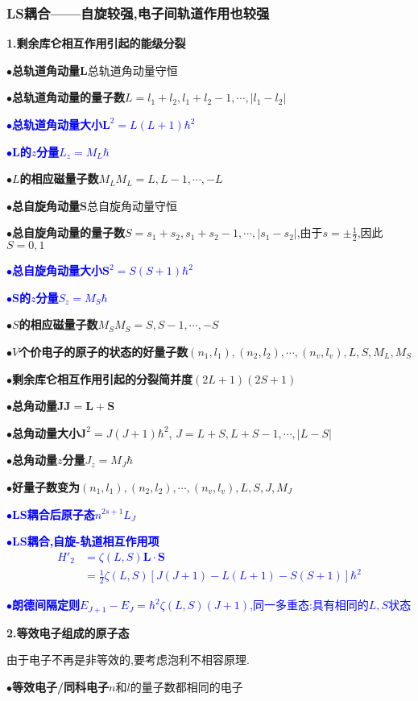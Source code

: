 \documentclass[UTF8]{article}
\newcommand{\keypoint}[2]{$\bullet$\textbf{#1}\quad#2\par}
\newcommand{\jumpline} {\hspace*{\fill} \par}
\begin{document}
\subsubsection{LS耦合——自旋较强,电子间轨道作用也较强}
\textbf{1.剩余库仑相互作用引起的能级分裂}\par
\keypoint{总轨道角动量$\bm{L}$}{总轨道角动量守恒}
\keypoint{总轨道角动量的量子数}{$L=l_1+l_2,l_1+l_2-1,\cdots,|l_1-l_2|$}
\textcolor{blue}{\keypoint{总轨道角动量大小}{$\bm{L}^2=L(L+1)\hbar^2$}}
\textcolor{blue}{\keypoint{$\bm{L}$的$z$分量}{$L_z=M_L\hbar$}}
\keypoint{$L$的相应磁量子数$M_L$}{$M_L=L,L-1,\cdots,-L$}
\keypoint{总自旋角动量$\bm{S}$}{总自旋角动量守恒}
\keypoint{总自旋角动量的量子数}{$S=s_1+s_2,s_1+s_2-1,\cdots,|s_1-s_2|$,由于$s=\pm\frac{1}{2}$,因此$S=0,1$}
\textcolor{blue}{\keypoint{总自旋角动量大小}{$\bm{S}^2=S(S+1)\hbar^2$}}
\textcolor{blue}{\keypoint{$\bm{S}$的$z$分量}{$S_z=M_S\hbar$}}
\keypoint{$S$的相应磁量子数$M_S$}{$M_S=S,S-1,\cdots,-S$}
\keypoint{$V$个价电子的原子的状态的好量子数}{$(n_1,l_1),(n_2,l_2),\cdots,(n_v,l_v),L,S,M_L,M_S$}
\keypoint{剩余库仑相互作用引起的分裂简并度}{$(2L+1)(2S+1)$}
\jumpline
\keypoint{总角动量$\bm{J}$}{$\bm{J}=\bm{L}+\bm{S}$}
\keypoint{总角动量大小}{$\bm{J}^2=J(J+1)\hbar^2$, $J=L+S,L+S-1,\cdots,|L-S|$}
\keypoint{总角动量$z$分量}{$J_z=M_J\hbar$}
\keypoint{好量子数变为}{$(n_1,l_1),(n_2,l_2),\cdots,(n_v,l_v),L,S,J,M_J$}
\textcolor{blue}{\keypoint{LS耦合后原子态}{$n^{2s+1}L_J$}}
\textcolor{blue}{\keypoint{LS耦合,自旋-轨道相互作用项}{
	\begin{align*}
	H'_2&=\zeta(L,S)\bm{L\cdot S}\\
		&=\frac{1}{2}\zeta(L,S)[J(J+1)-L(L+1)-S(S+1)]\hbar^2
	\end{align*}
}}
\textcolor{blue}{\keypoint{朗德间隔定则}{$E_{J+1}-E_J=\hbar^2\zeta(L,S)(J+1)$,同一多重态:具有相同的$L,S$状态}}
\textbf{2.等效电子组成的原子态}\par
由于电子不再是非等效的,要考虑泡利不相容原理.\par
\keypoint{等效电子/同科电子}{$n$和$l$的量子数都相同的电子}
\end{document}
